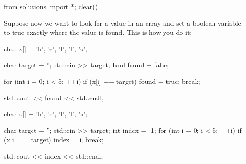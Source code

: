 \begin{python0}
from solutions import *; clear()
\end{python0}

Suppose now we want to look for a value in an array and set a boolean
variable to true exactly where the value is found. This is how you do
it:

\begin{consolethree}[escapeinside=||]
char x[] = {'h', 'e', 'l', 'l', 'o'};

char target = '';
std::cin >> target;
bool found = false;

for (int i = 0; i < 5; ++i)
{
    if (x[i] == target)
    {
        found = true;
        break;
    }
}

std::cout << found << std::endl; 
\end{consolethree}


\begin{consolethree}[escapeinside=||]
char x[] = {'h', 'e', 'l', 'l', 'o'};

char target = '';
std::cin >> target;
int index = -1;
for (int i = 0; i < 5; ++i)
{
    if (x[i] == target)
    {
        index = i;
        break;
    }
}

std::cout << index << std::endl; 
\end{consolethree}




